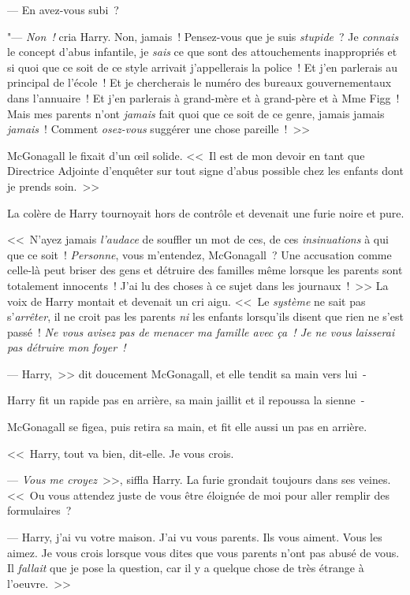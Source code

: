 --- En avez-vous subi~?

"--- \emph{Non~!} cria Harry. Non, jamais~! Pensez-vous que je suis \emph{stupide}~? Je \emph{connais} le concept d'abus infantile, je \emph{sais} ce que sont des attouchements inappropriés et si quoi que ce soit de ce style arrivait j'appellerais la police~! Et j'en parlerais au principal de l'école~! Et je chercherais le numéro des bureaux gouvernementaux dans l'annuaire~! Et j'en parlerais à grand-mère et à grand-père et à Mme Figg~! Mais mes parents n'ont \emph{jamais} fait quoi que ce soit de ce genre, jamais jamais \emph{jamais}~! Comment \emph{osez-vous} suggérer une chose pareille~!~>>

McGonagall le fixait d'un œil solide. <<~Il est de mon devoir en tant que Directrice Adjointe d'enquêter sur tout signe d'abus possible chez les enfants dont je prends soin.~>>

La colère de Harry tournoyait hors de contrôle et devenait une furie noire et pure.

<<~N'ayez jamais \emph{l'audace} de souffler un mot de ces, de ces \emph{insinuations} à qui que ce soit~! \emph{Personne}, vous m'entendez, McGonagall~? Une accusation comme celle-là peut briser des gens et détruire des familles même lorsque les parents sont totalement innocents~! J'ai lu des choses à ce sujet dans les journaux~!~>> La voix de Harry montait et devenait un cri aigu. <<~Le \emph{système} ne sait pas s'\emph{arrêter}, il ne croit pas les parents \emph{ni} les enfants lorsqu'ils disent que rien ne s'est passé~! \emph{Ne vous avisez pas de menacer ma famille avec ça~! Je ne vous laisserai pas détruire mon foyer~!}

--- Harry,~>> dit doucement McGonagall, et elle tendit sa main vers lui~-

Harry fit un rapide pas en arrière, sa main jaillit et il repoussa la sienne~-

McGonagall se figea, puis retira sa main, et fit elle aussi un pas en arrière.

<<~Harry, tout va bien, dit-elle. Je vous crois.

--- \emph{Vous me croyez}~>>, siffla Harry. La furie grondait toujours dans ses veines. <<~Ou vous attendez juste de vous être éloignée de moi pour aller remplir des formulaires~?

--- Harry, j'ai vu votre maison. J'ai vu vous parents. Ils vous aiment. Vous les aimez. Je vous crois lorsque vous dites que vous parents n'ont pas abusé de vous. Il \emph{fallait} que je pose la question, car il y a quelque chose de très étrange à l'oeuvre.~>>

